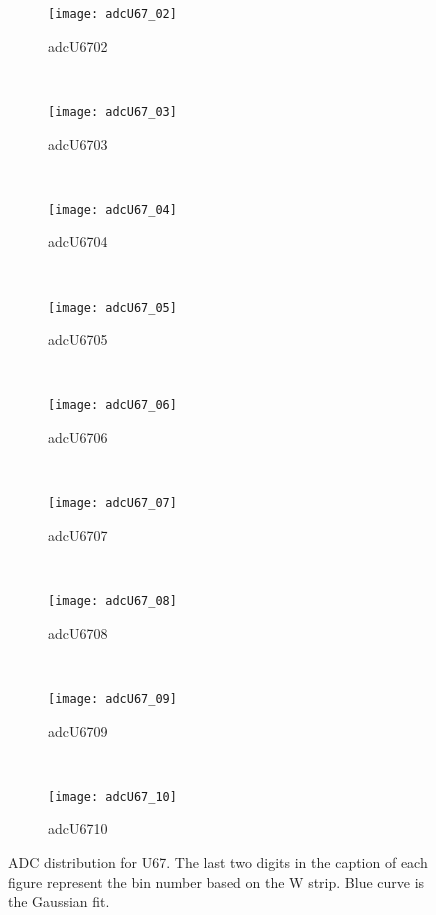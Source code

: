 \begin{figure}[h]
    \centering
    \begin{subfigure}[h]{0.3\textwidth}
        \centering
        \texttt{[image: adcU67\_02]}
        \caption{adcU6702}
        \label{fig:adcU67_02}
    \end{subfigure}
    ~
    \begin{subfigure}[h]{0.3\textwidth}
        \centering
        \texttt{[image: adcU67\_03]}
        \caption{adcU6703}
        \label{fig:adcU67_03}
    \end{subfigure}
    ~
    \begin{subfigure}[h]{0.3\textwidth}
        \centering
        \texttt{[image: adcU67\_04]}
        \caption{adcU6704}
        \label{fig:adcU67_04}
    \end{subfigure}
    \\
    \begin{subfigure}[h]{0.3\textwidth}
        \centering
        \texttt{[image: adcU67\_05]}
        \caption{adcU6705}
        \label{fig:adcU67_05}
    \end{subfigure}
    ~
    \begin{subfigure}[h]{0.3\textwidth}
        \centering
        \texttt{[image: adcU67\_06]}
        \caption{adcU6706}
        \label{fig:adcU67_06}
    \end{subfigure}
    ~
    \begin{subfigure}[h]{0.3\textwidth}
        \centering
        \texttt{[image: adcU67\_07]}
        \caption{adcU6707}
        \label{fig:adcU67_07}
    \end{subfigure}
    \\
    \begin{subfigure}[h]{0.3\textwidth}
        \centering
        \texttt{[image: adcU67\_08]}
        \caption{adcU6708}
        \label{fig:adcU67_08}
    \end{subfigure}
    ~
    \begin{subfigure}[h]{0.3\textwidth}
        \centering
        \texttt{[image: adcU67\_09]}
        \caption{adcU6709}
        \label{fig:adcU67_09}
    \end{subfigure}
    ~
    \begin{subfigure}[h]{0.3\textwidth}
        \centering
        \texttt{[image: adcU67\_10]}
        \caption{adcU6710}
        \label{fig:adcU67_10}
    \end{subfigure}
    \caption{ADC distribution for U67. The last two digits in the caption of each figure represent the bin number based on the W strip.
    Blue curve is the Gaussian fit.}
    \label{fig:adcU1}
\end{figure}

